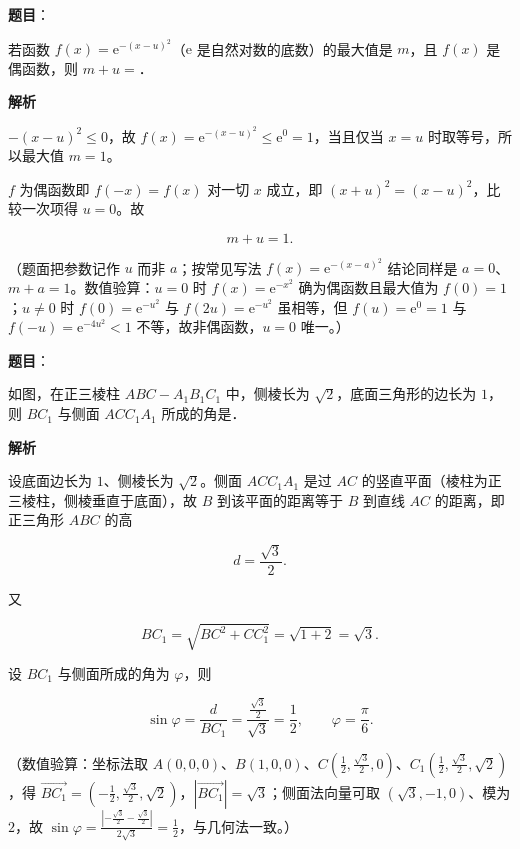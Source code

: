 \begin{answer}

\textbf{题目}：

若函数 $f(x)=\mathrm{e}^{-(x-u)^2}$（$\mathrm{e}$ 是自然对数的底数）的最大值是 $m$，且 $f(x)$ 是偶函数，则 $m+u=$\gkblank{}．

\textbf{解析}

$-(x-u)^{2}\leqslant0$，故 $f(x)=\mathrm{e}^{-(x-u)^{2}}\leqslant\mathrm{e}^{0}=1$，当且仅当 $x=u$ 时取等号，所以最大值 $m=1$。

$f$ 为偶函数即 $f(-x)=f(x)$ 对一切 $x$ 成立，即 $(x+u)^{2}=(x-u)^{2}$，比较一次项得 $u=0$。故

\nopagebreak[4]
\[m+u=1 .\]

（题面把参数记作 $u$ 而非 $a$；按常见写法 $f(x)=\mathrm{e}^{-(x-a)^{2}}$ 结论同样是 $a=0$、$m+a=1$。数值验算：$u=0$ 时 $f(x)=\mathrm{e}^{-x^{2}}$ 确为偶函数且最大值为 $f(0)=1$；$u\ne0$ 时 $f(0)=\mathrm{e}^{-u^{2}}$ 与 $f(2u)=\mathrm{e}^{-u^{2}}$ 虽相等，但 $f(u)=\mathrm{e}^{0}=1$ 与 $f(-u)=\mathrm{e}^{-4u^{2}}<1$ 不等，故非偶函数，$u=0$ 唯一。）


\end{answer}
\begin{answer}

\textbf{题目}：

如图，在正三棱柱 $ABC-A_1B_1C_1$ 中，侧棱长为 $\sqrt2$，底面三角形的边长为 $1$，则 $BC_1$ 与侧面 $ACC_1A_1$ 所成的角是\gkblank{}．
\nopagebreak[4]
\begin{center}\end{center}
\nopagebreak[4]
\textbf{解析}

设底面边长为 $1$、侧棱长为 $\sqrt2$。侧面 $ACC_1A_1$ 是过 $AC$ 的竖直平面（棱柱为正三棱柱，侧棱垂直于底面），故 $B$ 到该平面的距离等于 $B$ 到直线 $AC$ 的距离，即正三角形 $ABC$ 的高

\nopagebreak[4]
\[d=\frac{\sqrt3}{2}.\]

又

\nopagebreak[4]
\[BC_1=\sqrt{BC^{2}+CC_1^{2}}=\sqrt{1+2}=\sqrt3 .\]

设 $BC_1$ 与侧面所成的角为 $\varphi$，则

\nopagebreak[4]
\[\sin\varphi=\frac{d}{BC_1}=\frac{\frac{\sqrt3}{2}}{\sqrt3}=\frac12,\qquad \varphi=\frac{\pi}{6}.\]

（数值验算：坐标法取 $A(0,0,0)$、$B(1,0,0)$、$C\left(\frac12,\frac{\sqrt3}{2},0\right)$、$C_1\left(\frac12,\frac{\sqrt3}{2},\sqrt2\right)$，得 $\overrightarrow{BC_1}=\left(-\frac12,\frac{\sqrt3}{2},\sqrt2\right)$，$|\overrightarrow{BC_1}|=\sqrt3$；侧面法向量可取 $(\sqrt3,-1,0)$、模为 $2$，故 $\sin\varphi=\frac{\left|-\frac{\sqrt3}{2}-\frac{\sqrt3}{2}\right|}{2\sqrt3}=\frac12$，与几何法一致。）


\end{answer}
